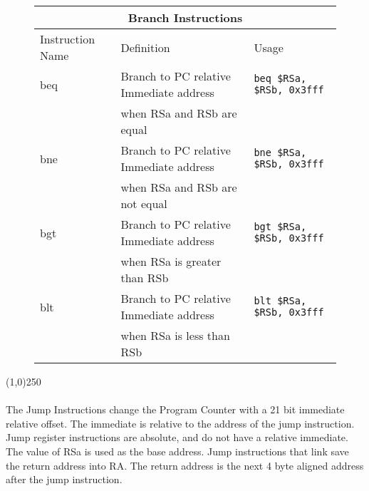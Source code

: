 \documentclass[letterpaper, 11pt]{article}
\begin{document}
\begin{figure}[!h]
	\begin{center}
		\begin{tabular}{|l|l|l|}
			\hline
			\multicolumn{3}{|c|}{Branch Instructions} \\ \hline
			Instruction Name	& Definition									& Usage 							\\ \hline
			beq					& Branch to PC relative Immediate address		& \texttt{beq \$RSa, \$RSb, 0x3fff}	\\ 
			\hfill				& when RSa and RSb are equal					& \hfill 							\\ \hline
			bne					& Branch to PC relative Immediate address		& \texttt{bne \$RSa, \$RSb, 0x3fff}	\\ 
			\hfill				& when RSa and RSb are not equal				& \hfill 							\\ \hline
			bgt					& Branch to PC relative Immediate address		& \texttt{bgt \$RSa, \$RSb, 0x3fff}	\\ 
			\hfill				& when RSa is greater than RSb					& \hfill 							\\ \hline
			blt					& Branch to PC relative Immediate address		& \texttt{blt \$RSa, \$RSb, 0x3fff}	\\ 
			\hfill				& when RSa is less than RSb						& \hfill 							\\ \hline
		 		\end{tabular} 
	\end{center}
	
\end{figure}
\begin{center}
	\line(1,0){250}
\end{center}



\paragraph{} The Jump Instructions change the Program Counter with a 21 bit immediate relative offset. The immediate is relative to the address
of the jump instruction. Jump register instructions are absolute, and do not have a relative immediate. The value of RSa is used as the base address.
Jump instructions that link save the return address into RA. The return address is the next 4 byte aligned address after the jump instruction.
\end{document}

